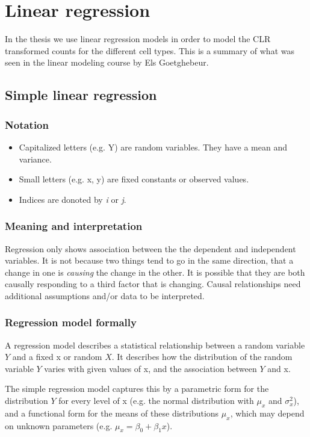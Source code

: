 \section{Linear regression}

In the thesis we use linear regression models in order to model the CLR transformed counts for the different cell types.
This is a summary of what was seen in the linear modeling course by Els Goetghebeur.

\subsection{Simple linear regression}
\subsubsection{Notation}
\begin{itemize}
    \item Capitalized letters (e.g. Y) are random variables. They have a mean and variance.
    \item Small letters (e.g. x, y) are fixed constants or observed values.
    \item Indices are donoted by \textit{i} or \textit{j}.
\end{itemize}

\subsubsection{Meaning and interpretation}
Regression only shows association between the the dependent and independent variables.
It is not because two things tend to go in the same direction, that a change in one is \textit{causing} the change in the other.
It is possible that they are both causally responding to a third factor that is changing.
Causal relationships need additional assumptions and/or data to be interpreted.

\subsubsection{Regression model formally}
A regression model describes a statistical relationship between a random variable $Y$ and a fixed x or random $X$.
It describes how the distribution of the random variable $Y$ varies with given values of x, and the association between $Y$ and x.

The simple regression model captures this by a parametric form for the distribution $Y$ for every level of x (e.g. the normal distribution with $\mu_x$ and $\sigma_x^2$), and a functional form for the means of these distributions $\mu_x$, which may depend on unknown parameters (e.g. $\mu_x = \beta_0 + \beta_1 x$).

